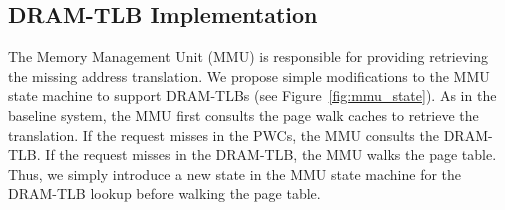 
% 


% 

\subsection{DRAM-TLB Implementation}

\noindent The Memory Management Unit (MMU) is responsible for
providing retrieving the missing address translation. We propose
simple modifications to the MMU state machine to support DRAM-TLBs
(see Figure~\ref{fig:mmu_state}). As in the baseline system, the MMU
first consults the page walk caches to retrieve the translation. If
the request misses in the PWCs, the MMU consults the DRAM-TLB. If the
request misses in the DRAM-TLB, the MMU walks the page table. Thus, we
simply introduce a new state in the MMU state machine for the DRAM-TLB
lookup before walking the page table.


